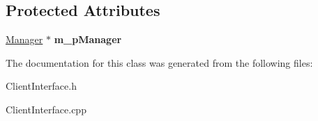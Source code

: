 \subsection*{Protected Attributes}
\begin{DoxyCompactItemize}
\item 
\mbox{\label{classTBT_1_1ClientInterface_a1d6558ab5cd2ebcc135e5fc37a1844ba}} 
\hyperlink{classTBT_1_1Manager}{Manager} $\ast$ {\bfseries m\+\_\+p\+Manager}
\end{DoxyCompactItemize}


The documentation for this class was generated from the following files\+:\begin{DoxyCompactItemize}
\item 
Client\+Interface.\+h\item 
Client\+Interface.\+cpp\end{DoxyCompactItemize}
